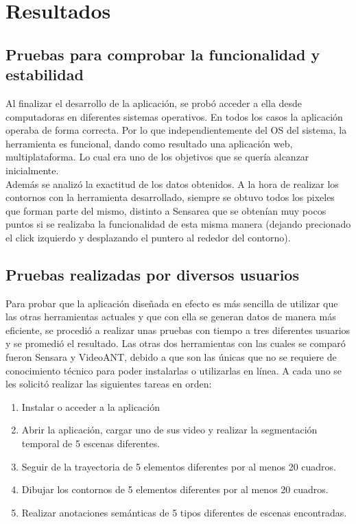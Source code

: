 \chapter{Resultados}

\section{Pruebas para comprobar la funcionalidad y estabilidad}

Al finalizar el desarrollo de la aplicación, se probó acceder a ella desde computadoras en diferentes sistemas operativos. En todos los casos la aplicación operaba de forma correcta. Por lo que independientemente del OS del sistema, la herramienta es funcional, dando como resultado una aplicación web, multiplataforma. Lo cual era uno de los objetivos que se quería alcanzar inicialmente.\\

Además se analizó la exactitud de los datos obtenidos. A la hora de realizar los contornos con la herramienta desarrollado, siempre se obtuvo todos los pixeles que forman parte del mismo, distinto a Sensarea que se obtenían muy pocos puntos si se realizaba la funcionalidad de esta misma manera (dejando precionado el click izquierdo y desplazando el puntero al rededor del contorno).


\section{Pruebas realizadas por diversos usuarios}

Para probar que la aplicación diseñada en efecto es más sencilla de utilizar que las otras herramientas actuales y que con ella se generan datos de manera más eficiente, se procedió a realizar unas pruebas con tiempo a tres diferentes usuarios y se promedió el resultado. Las otras dos herramientas con las cuales se comparó fueron Sensara y VideoANT, debido a que son las únicas que no se requiere de conocimiento técnico para poder instalarlas o utilizarlas en línea. A cada uno se les solicitó realizar las siguientes tareas en orden:

\begin{enumerate}
\item Instalar o acceder a la aplicación
\item Abrir la aplicación, cargar uno de sus video y realizar la segmentación temporal de 5 escenas diferentes.
\item Seguir de la trayectoria de 5 elementos diferentes por al menos 20 cuadros.
\item Dibujar los contornos de 5 elementos diferentes por al menos 20 cuadros.
\item Realizar anotaciones semánticas de 5 tipos diferentes de escenas encontradas.
\end{enumerate}

